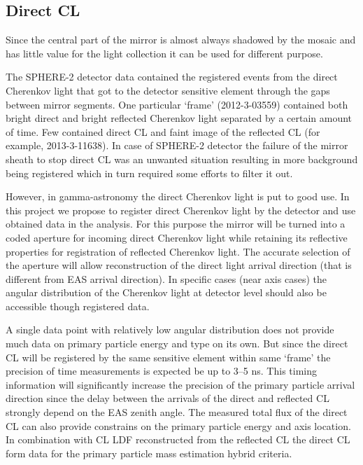 \documentclass[a4paper,11pt]{article}
\begin{document}


\subsection{Direct CL}

Since the central part of the mirror is almost always shadowed by the mosaic and has little value for the light collection it can be used for different purpose.

The SPHERE-2 detector data contained the registered events from the direct Cherenkov light that got to the detector sensitive element through the gaps between mirror segments. One particular `frame' (2012-3-03559) contained both bright direct and bright reflected Cherenkov light separated by a certain amount of time. Few contained direct CL and faint image of the reflected CL (for example, 2013-3-11638). In case of SPHERE-2 detector the failure of the mirror sheath to stop direct CL was an unwanted situation resulting in more background being registered which in turn required some efforts to filter it out.

However, in gamma-astronomy the direct Cherenkov light is put to good use. In this project we propose to register direct Cherenkov light by the detector and use obtained data in the analysis. For this purpose the mirror will be turned into a coded aperture for incoming direct Cherenkov light while retaining its reflective properties for registration of reflected Cherenkov light. The accurate selection of the aperture will allow reconstruction of the direct light arrival direction (that is different from EAS arrival direction). In specific cases (near axis cases) the angular distribution of the Cherenkov light at detector level should also be accessible though registered data.

A single data point with relatively low angular distribution does not provide much data on primary particle energy and type on its own. But since the direct CL will be registered by the same sensitive element within same `frame' the precision of time measurements is expected be up to 3--5 ns. This timing information will significantly increase the precision of the primary particle arrival direction since the delay between the arrivals of the direct and reflected CL strongly depend on the EAS zenith angle. The measured total flux of the direct CL can also provide constrains on the primary particle energy and axis location. In combination with CL LDF reconstructed from the reflected CL the direct CL form data for the primary particle mass estimation hybrid criteria.
\end{document}
